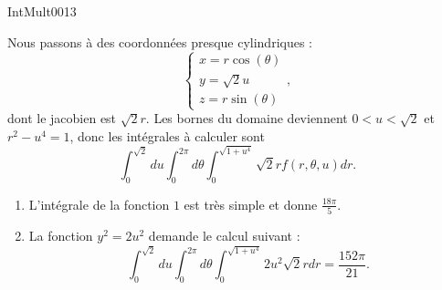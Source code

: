 
\begin{corrige}{IntMult0013}

	Nous passons à des coordonnées presque cylindriques :
	\begin{equation}
		\left\{
		\begin{array}{ll}
			x=r\cos(\theta)\\
			y=\sqrt{2}u\\
			z=r\sin(\theta)
		\end{array}
		\right.,
	\end{equation}
	dont le jacobien est $\sqrt{2}r$. Les bornes du domaine deviennent $0<u<\sqrt{2}$ et $r^2-u^4=1$, donc les intégrales à calculer sont
	\begin{equation}
		\int_0^{\sqrt{2}}du\int_0^{2\pi}d\theta\int_0^{\sqrt{1+u^4}}\sqrt{2}rf(r,\theta,u)dr.
	\end{equation}
	\begin{enumerate}

		\item
			L'intégrale de la fonction $1$ est très simple et donne $\frac{ 18\pi }{ 5 }$.
		\item
			La fonction $y^2=2u^2$ demande le calcul suivant :
			\begin{equation}
				\int_0^{\sqrt{2}}du\int_0^{2\pi}d\theta\int_0^{\sqrt{1+u^4}}2u^2\sqrt{2}rdr=\frac{ 152\pi }{ 21 }.
			\end{equation}

	\end{enumerate}

\end{corrige}
